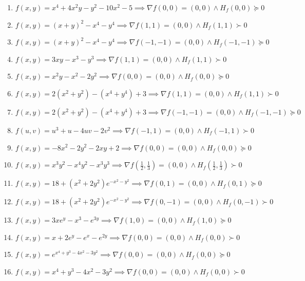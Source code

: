 \documentclass[11pt,a4paper]{article}
\begin{document}
\begin{enumerate}
\item $\displaystyle f(x, y) = x^{4} + 4x^{2} y - y^{2} - 10x^{2} - 5 \implies \nabla f(0, 0) = (0, 0) \land H_{f}(0, 0) \succeq 0$
\item $\displaystyle f(x, y) = (x + y)^{2} - x^{4} - y^{4} \implies \nabla f(1, 1) = (0, 0) \land H_{f}(1, 1) \succ 0$
\item $\displaystyle f(x, y) = (x + y)^{2} - x^{4} - y^{4} \implies \nabla f(-1, -1) = (0, 0) \land H_{f}(-1, -1) \succeq 0$
\item $\displaystyle f(x, y) = 3xy - x^{3} - y^{3} \implies \nabla f(1, 1) = (0, 0) \land H_{f}(1, 1) \succ 0$
\item $\displaystyle f(x, y) = x^{2} y - x^{2} - 2y^{2} \implies \nabla f(0, 0) = (0, 0) \land H_{f}(0, 0) \succeq 0$
\item $\displaystyle f(x, y) = 2(x^{2} + y^{2}) - (x^{4} + y^{4}) + 3 \implies \nabla f(1, 1) = (0, 0) \land H_{f}(1, 1) \succ 0$
\item $\displaystyle f(x, y) = 2(x^{2} + y^{2}) - (x^{4} + y^{4}) + 3 \implies \nabla f(-1, -1) = (0, 0) \land H_{f}(-1, -1) \succeq 0$
\item $\displaystyle f(u, v) = u^{3} + u - 4uv - 2v^{2} \implies \nabla f(-1, 1) = (0, 0) \land H_{f}(-1, 1) \succ 0$
\item $\displaystyle f(x, y) = -8x^{2} - 2y^{2} - 2xy + 2 \implies \nabla f(0, 0) = (0, 0) \land H_{f}(0, 0) \succeq 0$
\item $\displaystyle f(x, y) = x^{3} y^{2} - x^{4} y^{2} - x^{3} y^{3} \implies \nabla f\left( \frac{1}{2}, \frac{1}{3} \right) = (0, 0) \land H_{f}\left( \frac{1}{2}, \frac{1}{3} \right) \succ 0$
\item $\displaystyle f(x, y) = 18 + (x^{2} + 2y^{2}) e^{-x^{2} - y^{2}} \implies \nabla f(0, 1) = (0, 0) \land H_{f}(0, 1) \succeq 0$
\item $\displaystyle f(x, y) = 18 + (x^{2} + 2y^{2}) e^{-x^{2} - y^{2}} \implies \nabla f(0, -1) = (0, 0) \land H_{f}(0, -1) \succ 0$
\item $\displaystyle f(x, y) = 3x e^{y} - x^{3} - e^{3y} \implies \nabla f(1, 0) = (0, 0) \land H_{f}(1, 0) \succeq 0$
\item $\displaystyle f(x, y) = x + 2e^{y} - e^{x} - e^{2y} \implies \nabla f(0, 0) = (0, 0) \land H_{f}(0, 0) \succ 0$
\item $\displaystyle f(x, y) = e^{x^{4} + y^{3} - 4x^{2} - 3y^{2}} \implies \nabla f(0, 0) = (0, 0) \land H_{f}(0, 0) \succeq 0$
\item $\displaystyle f(x, y) = x^{4} + y^{3} - 4x^{2} - 3y^{2} \implies \nabla f(0, 0) = (0, 0) \land H_{f}(0, 0) \succ 0$

\end{enumerate}
\end{document}
